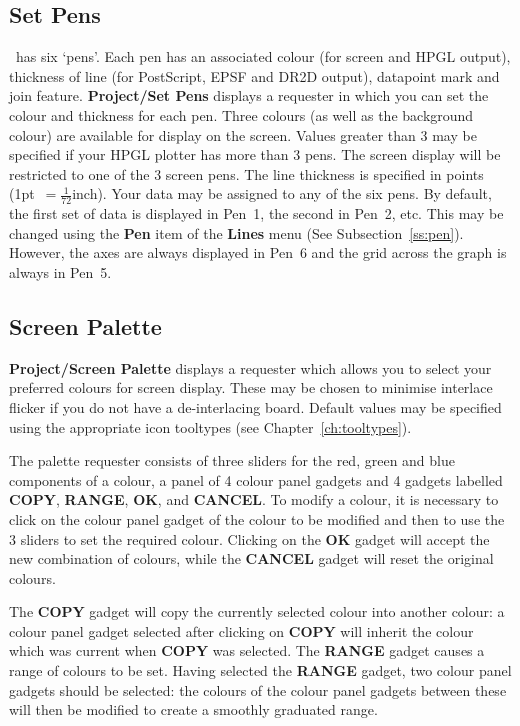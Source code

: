 \subsection{Set Pens}
\amplot\ has six `pens'. Each pen has an associated colour (for 
screen and HPGL output), thickness of line (for PostScript, EPSF and DR2D output), 
datapoint mark and join feature.
{\bf Project/Set Pens} displays a requester in which you can set the colour and 
thickness for each pen. Three colours (as well as the background colour) are 
available for display on the screen. Values greater than 3 may be specified if your 
HPGL plotter has more than 3 pens. The screen display will be restricted to one of 
the 3 screen pens. The line thickness is specified in points 
(1pt~$=\frac{1}{72}$inch). Your data may be assigned to any of the six pens. By 
default, the first set of data is displayed in Pen~1, the second in Pen~2, etc.
This may be changed using the {\bf Pen} item of the {\bf Lines} menu (See 
Subsection~\ref{ss:pen}).
However, the axes are always displayed in Pen~6 and the grid across the graph is 
always in Pen~5.

\subsection{Screen Palette}
{\bf Project/Screen Palette} displays a requester which 
allows you to select 
your preferred colours for screen display. These may be chosen to minimise 
interlace flicker if you do not have a de-interlacing board. Default values may be 
specified using the appropriate icon tooltypes (see Chapter~\ref{ch:tooltypes}).

The palette requester consists of three sliders for the red, green and blue 
components of a colour, a panel of 4 colour panel gadgets and 4 gadgets labelled 
{\bf COPY}, {\bf RANGE}, {\bf OK}, and {\bf CANCEL}. To modify a colour, it is 
necessary to click on 
the colour panel gadget of the colour to be modified and then to use the 3 sliders 
to set the required colour. Clicking on the {\bf OK} gadget will accept the new 
combination of colours, while the {\bf CANCEL} gadget will reset the original colours.

The {\bf COPY} gadget  will copy the currently selected colour into another colour: a 
colour panel gadget selected after clicking on {\bf COPY} will inherit the 
colour which was current when {\bf COPY} was selected. The {\bf RANGE} gadget 
causes a range of colours to be set. Having selected the {\bf RANGE} gadget, 
two colour panel gadgets should be 
selected: the colours of the colour panel gadgets between these will then be 
modified to create a smoothly graduated range.

